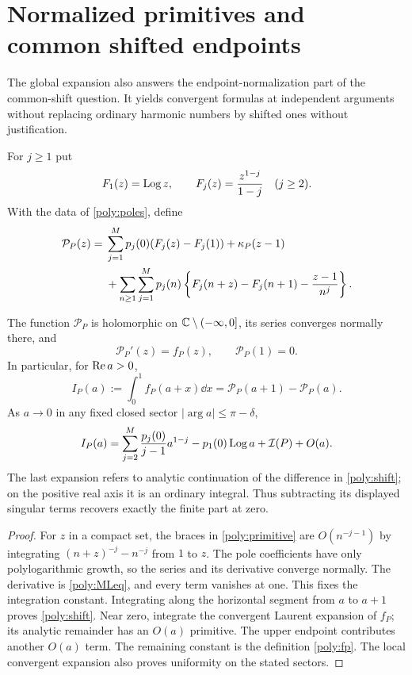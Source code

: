 \section{Normalized primitives and common shifted endpoints}
\label{poly:primitives}

The global expansion also answers the endpoint-normalization part of
the common-shift question. It yields convergent formulas at independent
arguments without replacing ordinary harmonic numbers by shifted ones
without justification.

For $j\ge1$ put
\[
 F_1(z)=\operatorname{Log} z,\qquad F_j(z)=\frac{z^{1-j}}{1-j}\quad(j\ge2).
\]
With the data of \eqref{poly:poles}, define
\begin{align}\label{poly:primitive}
 \mathcal P_P(z)={}&\sum_{j=1}^Mp_j(0)(F_j(z)-F_j(1))
                  +\kappa_P(z-1)\notag\\
 &+\sum_{n\ge1}\sum_{j=1}^Mp_j(n)
 \left\{F_j(n+z)-F_j(n+1)-\frac{z-1}{n^j}\right\}.
\end{align}

\begin{theorem}
\label{poly:primitivethm}
The function $\mathcal P_P$ is holomorphic on
$\mathbb C\setminus(-\infty,0]$, its series converges normally there,
and
\begin{equation}\label{poly:primitiveidentity}
 \mathcal P_P'(z)=f_P(z),\qquad \mathcal P_P(1)=0.
\end{equation}
In particular, for $\operatorname{Re} a>0$,
\begin{equation}\label{poly:shift}
 I_P(a):=\int_0^1f_P(a+x)\dd x
        =\mathcal P_P(a+1)-\mathcal P_P(a).
\end{equation}
As $a\to0$ in any fixed closed sector $|\arg a|\le\pi-\delta$,
\begin{equation}\label{poly:shiftlimit}
 I_P(a)=\sum_{j=2}^M\frac{p_j(0)}{j-1}a^{1-j}
          -p_1(0)\operatorname{Log} a+\mathcal I(P)+O(a).
\end{equation}
The last expansion refers to analytic continuation of the difference
in \eqref{poly:shift}; on the positive real axis it is an ordinary
integral. Thus subtracting its displayed singular terms recovers
exactly the finite part at zero.
\end{theorem}

\begin{proof}
For $z$ in a compact set, the braces in \eqref{poly:primitive}
are $O(n^{-j-1})$ by integrating
$(n+z)^{-j}-n^{-j}$ from $1$ to $z$. The pole coefficients have only
polylogarithmic growth, so the series and its derivative converge
normally. The derivative is \eqref{poly:MLeq}, and every term vanishes
at one. This fixes the integration constant.
Integrating along the horizontal segment from $a$ to $a+1$ proves
\eqref{poly:shift}. Near zero, integrate the convergent Laurent expansion
of $f_P$; its analytic remainder has an $O(a)$ primitive. The upper
endpoint contributes another $O(a)$ term. The remaining constant is
the definition \eqref{poly:fp}. The local convergent expansion also
proves uniformity on the stated sectors.
\end{proof}

